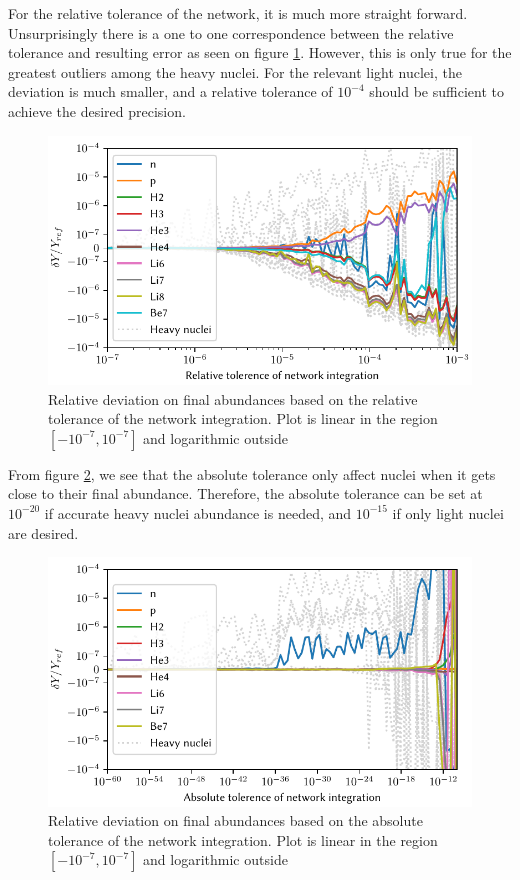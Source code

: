 For the relative tolerance of the network, it is much more straight forward. Unsurprisingly there is a one to one correspondence between the relative tolerance and resulting error as seen on figure \ref{fig:rtolnet}. However, this is only true for the greatest outliers among the heavy nuclei. For the relevant light nuclei, the deviation is much smaller, and a relative tolerance of $10^{-4}$ should be sufficient to achieve the desired precision. 
\begin{figure}[ht]
    \includegraphics[width=5.1in]{figures/rtolnet.pdf}
    \caption{Relative deviation on final abundances based on the relative tolerance of the network integration. Plot is linear in the region $[-10^{-7},10^{-7}]$ and logarithmic outside}
    \label{fig:rtolnet}
\end{figure}


From figure \ref{fig:atolnet}, we see that the absolute tolerance only affect nuclei when it gets close to their final abundance. Therefore, the absolute tolerance can be set at $10^{-20}$ if accurate heavy nuclei abundance is needed, and $10^{-15}$ if only light nuclei are desired.
\begin{figure}[ht]
    \includegraphics[width=5.1in]{figures/atolnet.pdf}
    \caption{Relative deviation on final abundances based on the absolute tolerance of the network integration. Plot is linear in the region $[-10^{-7},10^{-7}]$ and logarithmic outside}
    \label{fig:atolnet}
\end{figure}



